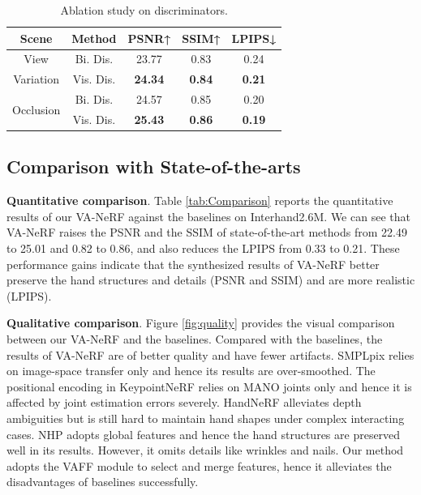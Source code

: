 \documentclass[letterpaper]{article} %
\begin{document}
\begin{table}[t]
\centering
\caption{Ablation study on discriminators.}
\label{tab:disc}
\begin{tabular}{ccccc}
\toprule
Scene  & Method & PSNR↑    & SSIM↑    & LPIPS↓     \\
\midrule
View & Bi. Dis. &  23.77  &  0.83  &  0.24  \\ \cline{2-5}
Variation & Vis. Dis.  &  \textbf{24.34}  &  \textbf{0.84}   &  \textbf{0.21}     \\ \hline
\multirow[c]{2}{*}{Occlusion} & Bi. Dis. &  24.57  &  0.85  &  0.20  \\ \cline{2-5}
 & Vis. Dis.  &  \textbf{25.43}   &  \textbf{0.86}  &  \textbf{0.19}    \\
\bottomrule
\end{tabular}
\end{table}



\subsection{Comparison with State-of-the-arts}

\textbf{Quantitative comparison}. Table \ref{tab:Comparison} reports the quantitative results of our VA-NeRF against the baselines on Interhand2.6M. We can see that VA-NeRF raises the PSNR and the SSIM of state-of-the-art methods from 22.49 to 25.01 and 0.82 to 0.86, and also reduces the LPIPS from 0.33 to 0.21. These performance gains indicate that the synthesized results of VA-NeRF better preserve the hand structures and details (PSNR and SSIM) and are more realistic (LPIPS).

\noindent\textbf{Qualitative comparison}. Figure \ref{fig:quality} provides the visual comparison between our VA-NeRF and the baselines. Compared with the baselines, the results of VA-NeRF are of better quality and have fewer artifacts. SMPLpix relies on image-space transfer only and hence its results are over-smoothed. The positional encoding in KeypointNeRF relies on MANO joints only and hence it is affected by joint estimation errors severely. HandNeRF alleviates depth ambiguities but is still hard to maintain hand shapes under complex interacting cases. NHP adopts global features and hence the hand structures are preserved well in its results. However, it omits details like wrinkles and nails. Our method adopts the VAFF module to select and merge features, hence it alleviates the disadvantages of baselines successfully.
\end{document}
